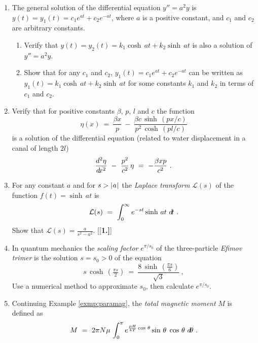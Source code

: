 {\begin{enumerate}[\bfseries 1.]
\begin{enumerate}[\bfseries (a)]
   that $I = \coth^{-1} 3 \;-\; \coth^{-1} 2$.
  \item Use the substitution $u = \frac{1}{x}$ in the integral, then use
   $\ddx\,(\tanh^{-1} x) = \frac{1}{1-x^2}$ for $\abs{x} < 1$ to show
   that $I = \tanh^{-1} \frac{1}{3} \;-\; \tanh^{-1} \frac{1}{2}$. Is this
   answer equivalent to the answer from part (a)? Explain.
 \end{enumerate}
[{[\bfseries 1.]}]
 \item The general solution of the differential equation $y''=a^2y$ is
  $y(t) = y_1(t) = c_1e^{at} + c_2e^{-at}$, where $a$ is a positive constant,
  and $c_1$ and $c_2$ are arbitrary constants.
 \begin{enumerate}[\bfseries (a)]
  \item Verify that $y(t) = y_2(t) = k_1\cosh\,at + k_2\sinh\,at$ is also a
   solution of $y''=a^2y$.
  \item Show that for any $c_1$ and $c_2$, $y_1(t) = c_1e^{at} + c_2e^{-at}$ can
  be written as $y_1(t) = k_1\cosh\,at + k_2\sinh\,at$ for some
  constants $k_1$ and $k_2$ in terms of $c_1$ and $c_2$.
 \end{enumerate}
 \item Verify that for positive constants $\beta$, $p$, $l$ and $c$ the function
\[
\eta(x) ~=~ \frac{\beta x}{p} ~-~ \frac{\beta c\,\sinh\,(px/c)}{p^2 \,\cosh\,(pl/c)}
\]
is a solution of the differential equation (related to water
displacement in a canal of length $2l$)
\[
\frac{d^2 \eta}{d\!x^2} ~-~ \frac{p^2}{c^2}\,\eta ~=~ -\frac{\beta xp}{c^2} ~.
\]
 \item For any constant $a$ and for $s > \lvert\mspace{1mu}a\mspace{1mu}\rvert$ the
  \emph{Laplace transform} $\mathcal{L}(s)$ of the
  function $f(t) = \sinh\,at$ is
\[
\mathcal{L}(s) ~=~ \int_0^{\infty} e^{-st} \sinh\,at~d\!t ~.
\]
Show that $\mathcal{L}(s) = \frac{a}{s^2 - a^2}$.
[{[\bfseries 1.]}]
 \item In quantum mechanics the \emph{scaling factor} $e^{\pi/s_0}$ of the
  three-particle \emph{Efimov trimer} is the solution
  $s=s_0 > 0$ of the equation
\[
s\,\cosh\,\left(\tfrac{\pi s}{2}\right) ~=~
\frac{8\,\sinh\,\left(\tfrac{\pi s}{6}\right)}{\sqrt{3}} ~,
\]
Use a numerical method to approximate $s_0$, then calculate $e^{\pi/s_0}$.
 \item Continuing Example \ref{exmp:paramag}, the \emph{total magnetic moment}
  $M$ is defined as
\[
M ~=~ 2\pi N\mu\,\int_0^{\pi} e^{\frac{\mu H}{kT}\cos\,\theta}\sin\,\theta\;\cos\,\theta~d\!\theta ~.
\]
\end{enumerate}}
